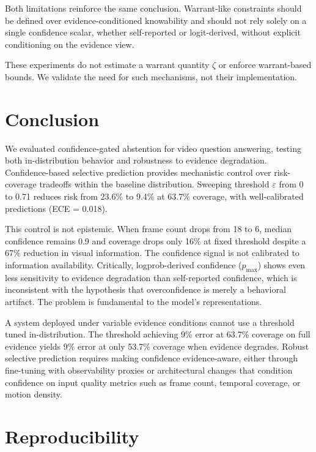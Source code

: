 \documentclass{article}
\begin{document}
Both limitations reinforce the same conclusion. Warrant-like constraints should be defined over evidence-conditioned knowability and should not rely solely on a single confidence scalar, whether self-reported or logit-derived, without explicit conditioning on the evidence view.

These experiments do not estimate a warrant quantity $\zeta$ or enforce warrant-based bounds. We validate the need for such mechanisms, not their implementation.

\section{Conclusion}

We evaluated confidence-gated abstention for video question answering, testing both in-distribution behavior and robustness to evidence degradation. Confidence-based selective prediction provides mechanistic control over risk-coverage tradeoffs within the baseline distribution. Sweeping threshold $\varepsilon$ from 0 to 0.71 reduces risk from 23.6\% to 9.4\% at 63.7\% coverage, with well-calibrated predictions (ECE = 0.018).

This control is not epistemic. When frame count drops from 18 to 6, median confidence remains 0.9 and coverage drops only 16\% at fixed threshold despite a 67\% reduction in visual information. The confidence signal is not calibrated to information availability. Critically, logprob-derived confidence ($p_{\max}$) shows even less sensitivity to evidence degradation than self-reported confidence, which is inconsistent with the hypothesis that overconfidence is merely a behavioral artifact. The problem is fundamental to the model's representations.

A system deployed under variable evidence conditions cannot use a threshold tuned in-distribution. The threshold achieving 9\% error at 63.7\% coverage on full evidence yields 9\% error at only 53.7\% coverage when evidence degrades. Robust selective prediction requires making confidence evidence-aware, either through fine-tuning with observability proxies or architectural changes that condition confidence on input quality metrics such as frame count, temporal coverage, or motion density.

\section*{Reproducibility}
\end{document}
